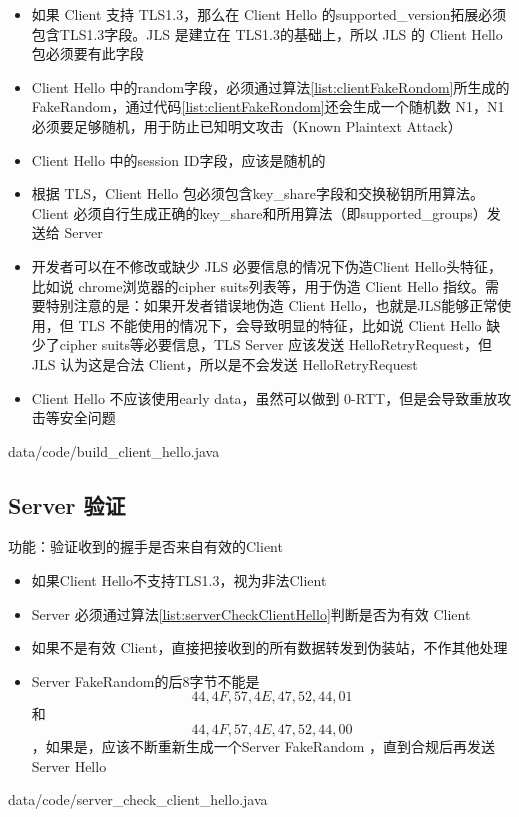 \begin{itemize}
	\item 如果 Client 支持 TLS1.3，那么在 Client Hello 的supported\_version拓展必须包含TLS1.3字段。JLS 是建立在 TLS1.3的基础上，所以 JLS 的 Client Hello 包必须要有此字段

	\item Client Hello 中的random字段，必须通过算法\ref{list:clientFakeRondom}所生成的FakeRandom，通过代码\ref{list:clientFakeRondom}还会生成一个随机数 N1，N1 必须要足够随机，用于防止已知明文攻击（Known Plaintext Attack）

	\item Client Hello 中的session ID字段，应该是随机的

	\item 根据 TLS，Client Hello 包必须包含key\_share字段和交换秘钥所用算法。Client 必须自行生成正确的key\_share和所用算法（即supported\_groups）发送给 Server

	\item 开发者可以在不修改或缺少 JLS 必要信息的情况下伪造Client Hello头特征，比如说 chrome浏览器的cipher suits列表等，用于伪造 Client Hello 指纹。需要特别注意的是：如果开发者错误地伪造 Client Hello，也就是JLS能够正常使用，但 TLS 不能使用的情况下，会导致明显的特征，比如说 Client Hello 缺少了cipher suits等必要信息，TLS Server 应该发送 HelloRetryRequest，但JLS 认为这是合法 Client，所以是不会发送 HelloRetryRequest
	\item Client Hello 不应该使用early data，虽然可以做到 0-RTT，但是会导致重放攻击等安全问题
\end{itemize}

 {data/code/build_client_hello.java}


\subsection{Server 验证}
功能：验证收到的握手是否来自有效的Client
\begin{itemize}
	\item 如果Client Hello不支持TLS1.3，视为非法Client
	\item Server 必须通过算法\ref{list:serverCheckClientHello}判断是否为有效 Client
	\item 如果不是有效 Client，直接把接收到的所有数据转发到伪装站，不作其他处理
	\item Server FakeRandom的后8字节不能是\[ 44,4F,57,4E,47,52,44,01 \]和\[ 44,4F,57,4E,47,52,44,00 \]，如果是，应该不断重新生成一个Server FakeRandom ，直到合规后再发送 Server Hello
\end{itemize}
 {data/code/server_check_client_hello.java}

